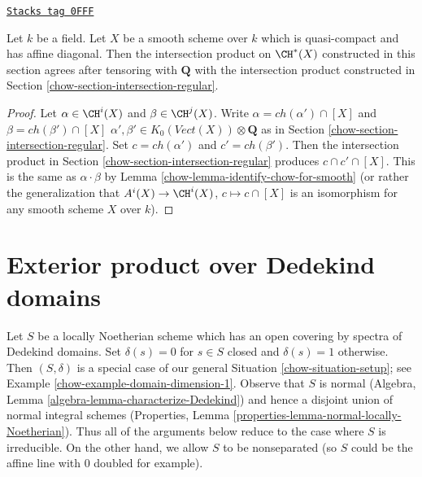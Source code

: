 \begin{lemma}
\label{chow-lemma-intersection-regular-smooth}
\href{https://stacks.math.columbia.edu/tag/0FFF}{\texttt{Stacks tag 0FFF}}

Let $k$ be a field. Let $X$ be a smooth scheme over $k$ which is
quasi-compact and has affine diagonal. Then the intersection
product on $\CH^*(X)$ constructed in this section agrees
after tensoring with $\mathbf{Q}$ with the intersection product
constructed in Section \ref{chow-section-intersection-regular}.
\end{lemma}

\begin{proof}

Let $\alpha \in \CH^i(X)$ and $\beta \in \CH^j(X)$. Write
$\alpha = ch(\alpha') \cap [X]$ and $\beta = ch(\beta') \cap [X]$
$\alpha', \beta' \in K_0(\textit{Vect}(X)) \otimes \mathbf{Q}$
as in Section \ref{chow-section-intersection-regular}.
Set $c = ch(\alpha')$ and $c' = ch(\beta')$.
Then the intersection product in Section \ref{chow-section-intersection-regular}
produces $c \cap c' \cap [X]$. This is the same as $\alpha \cdot \beta$
by Lemma \ref{chow-lemma-identify-chow-for-smooth} (or rather the
generalization that $A^i(X) \to \CH^i(X)$, $c \mapsto c \cap [X]$
is an isomorphism for any smooth scheme $X$ over $k$).
\end{proof}

\section{Exterior product over Dedekind domains}
\label{chow-section-exterior-product-dim-1}
Let $S$ be a locally Noetherian scheme which has an open covering
by spectra of Dedekind domains. Set $\delta(s) = 0$ for $s \in S$ closed
and $\delta(s) = 1$ otherwise. Then $(S, \delta)$ is a special case of our
general Situation \ref{chow-situation-setup}; see
Example \ref{chow-example-domain-dimension-1}.
Observe that $S$ is normal
(Algebra, Lemma \ref{algebra-lemma-characterize-Dedekind})
and hence a disjoint union of normal integral schemes
(Properties, Lemma \ref{properties-lemma-normal-locally-Noetherian}).
Thus all of the arguments below reduce to the case where $S$ is
irreducible. On the other hand, we allow $S$ to be nonseparated (so $S$
could be the affine line with $0$ doubled for example).

